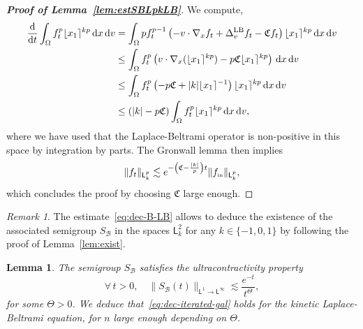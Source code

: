 \documentclass[11pt]{amsart}
\newtheorem{lemma}[theorem]{Lemma}
\theoremstyle{definition}
\theoremstyle{remark}
\newtheorem{remark}[theorem]{Remark}
\numberwithin{equation}{section}
\def\BB{{\mathcal B}}
\newcommand{\dd}{{\, \mathrm d}}
\newcommand{\dt}{\frac{{\rm d}}{{\rm d}t}}
\newcommand{\init}{\text{{\tiny {\rm in}}}}
\newcommand{\sfL}{\mathsf{L}}
\newcommand{\wangle}[1]{\lfloor #1 \rceil}
\begin{document}
\begin{proof}[{\bf Proof of Lemma~\ref{lem:estSBLpkLB}}]
  We compute,
  \begin{align*}
    \dt \int_\Omega f_t ^p \wangle{x_1}^{kp} \dd x \dd v
    & = \int_\Omega p f_t^{p-1} \left( - v \cdot \nabla_x f_t + \Delta_v^{\text{LB}} f_t - \mathfrak{C}f_t \right) \wangle{x_1}^{kp} \dd x \dd v \\
    & \le \int_\Omega f_t ^p \left( v \cdot \nabla_x (\wangle{x_1}^{kp}) - p \mathfrak{C} \wangle{x_1}^{kp}\right) \dd x \dd v  \\
    & \le \int_\Omega f_t ^p \left( - p \mathfrak{C} + |k|\wangle{x_1}^{-1}  \right)  \wangle{x_1}^{kp} \dd x \dd v  \\
    &\le \left(|k| - p \mathfrak{C}\right)  \int_\Omega f_t ^p \wangle{x_1}^{kp} \dd x \dd v,
  \end{align*}
  where we have used that the Laplace-Beltrami operator is non-positive in this space by integration by parts. The Gronwall lemma then implies
  \begin{equation*}
    \| f_t \|_{\sfL^{p}_{k}} \lesssim e^{- \left( \mathfrak{C} - \frac{|k|}{p} \right) t} \| f_\init \|_{\sfL^{p}_{k}},
  \end{equation*}
  which concludes the proof by choosing $\mathfrak{C}$ large enough.
\end{proof}

\begin{remark}
  The estimate~\eqref{eq:dec-B-LB} allows to deduce the existence of the associated semigroup $S_\BB$ in the spaces $\sfL^{2}_k$ for any $k \in \{-1,0,1\}$ by following the proof of Lemma~\ref{lem:exist}.
\end{remark}

\begin{lemma}
  \label{lem:estSBL1LinftyLB}
  The semigroup $S_{\mathcal B}$ satisfies the ultracontractivity property
  \begin{equation}
    \label{eq:dec-U-LB}
    \forall \, t >0,\quad \big\| S_\BB (t) \big\|_{\sfL^{1} \to \sfL^{\infty}}
    \lesssim \frac{e^{-t}}{t^\Theta},
  \end{equation}
  for some $\Theta >0$. We deduce that~\eqref{eq:dec-iterated-gal} holds for the kinetic Laplace-Beltrami equation, for $n$ large enough depending on $\Theta$.
\end{lemma}
\end{document}
